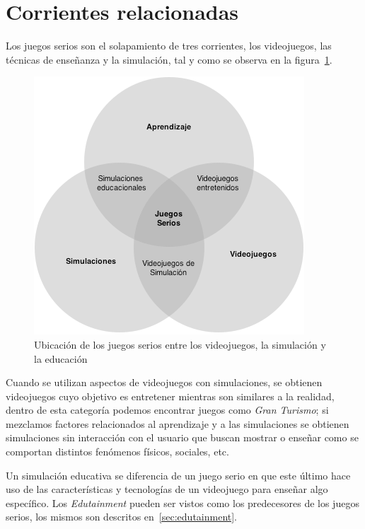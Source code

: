 \section{Corrientes relacionadas}

Los juegos serios son el solapamiento de tres corrientes, los videojuegos, las
técnicas de enseñanza y la simulación\cite{education:games}, tal y
como se observa en la figura~\ref{fig:corrientes_relacionadas}. 

\begin{figure}[ht]
\centering
\includegraphics[scale=0.7]{juegos_serios/corrientes_paralelas.png}
\caption{Ubicación de los juegos serios entre los videojuegos, la simulación y
    la educación}
\label{fig:corrientes_relacionadas}
\end{figure}

Cuando se utilizan aspectos de videojuegos con simulaciones, se obtienen videojuegos
cuyo objetivo es entretener mientras son similares a la realidad, dentro de esta
categoría podemos encontrar juegos como \emph{Gran Turismo}; si mezclamos
factores relacionados al aprendizaje y a las simulaciones se obtienen
simulaciones sin interacción con el usuario que buscan mostrar o enseñar como se
comportan distintos fenómenos físicos, sociales, etc.

Un simulación educativa se diferencia de un juego serio en que este último hace uso 
de las características y tecnologías de un videojuego para enseñar algo específico. Los 
\emph{Edutainment} pueden ser vistos como los predecesores de los juegos
serios, los mismos son descritos en~\ref{sec:edutainment}.

